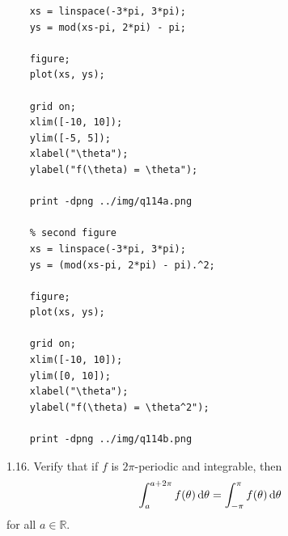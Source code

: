 \documentclass{article}
\newcommand{\R}{\mathbb{R}}
\begin{document}
\newpage

\begin{lstlisting}[caption = {Code to generate plots},captionpos=b,label={lst:1}]
    % first figure
    xs = linspace(-3*pi, 3*pi);
    ys = mod(xs-pi, 2*pi) - pi;

    figure;
    plot(xs, ys);

    grid on;
    xlim([-10, 10]);
    ylim([-5, 5]);
    xlabel("\theta");
    ylabel("f(\theta) = \theta");

    print -dpng ../img/q114a.png

    % second figure
    xs = linspace(-3*pi, 3*pi);
    ys = (mod(xs-pi, 2*pi) - pi).^2;

    figure;
    plot(xs, ys);

    grid on;
    xlim([-10, 10]);
    ylim([0, 10]);
    xlabel("\theta");
    ylabel("f(\theta) = \theta^2");

    print -dpng ../img/q114b.png
\end{lstlisting}

\newpage

1.16. Verify that if $f$ is $2\pi$-periodic and integrable, then
%
\begin{equation*}
    \int_a^{a + 2 \pi} f(\theta) \dif \theta = \int_{-\pi}^\pi f(\theta) \dif \theta
\end{equation*}
%
for all $a \in \R$.
\end{document}
